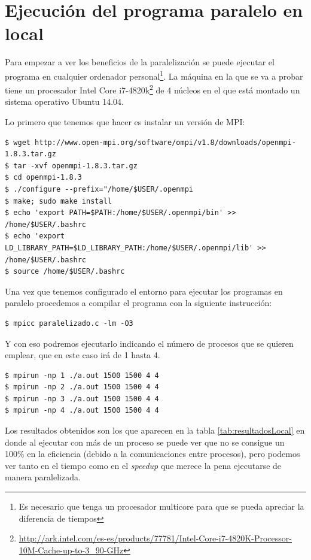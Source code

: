 \documentclass{article}
\begin{document}
\clearpage

\section{Ejecución del  programa paralelo en local}\label{sec:ejLocal}
	Para empezar a ver los beneficios de la paralelización se puede ejecutar el programa en cualquier ordenador personal\footnote{Es necesario que tenga un procesador multicore para que se pueda apreciar la diferencia de tiempos}. La máquina en la que se va a probar tiene un procesador Intel Core i7-4820k\footnote{\url{http://ark.intel.com/es-es/products/77781/Intel-Core-i7-4820K-Processor-10M-Cache-up-to-3_90-GHz}} de 4 núcleos en el que está montado un sistema operativo Ubuntu 14.04.
	
	Lo primero que tenemos que hacer es instalar un versión de MPI:
\begin{lstlisting}[style=minibash]
$ wget http://www.open-mpi.org/software/ompi/v1.8/downloads/openmpi-1.8.3.tar.gz
$ tar -xvf openmpi-1.8.3.tar.gz
$ cd openmpi-1.8.3
$ ./configure --prefix="/home/$USER/.openmpi
$ make; sudo make install
$ echo 'export PATH=$PATH:/home/$USER/.openmpi/bin' >> /home/$USER/.bashrc
$ echo 'export LD_LIBRARY_PATH=$LD_LIBRARY_PATH:/home/$USER/.openmpi/lib' >> /home/$USER/.bashrc
$ source /home/$USER/.bashrc
\end{lstlisting}

	Una vez que tenemos configurado el entorno para ejecutar los programas en paralelo procedemos a compilar el programa con la siguiente instrucción:
\begin{lstlisting}[style=minibash]
$ mpicc paralelizado.c -lm -O3
\end{lstlisting}
	Y con eso podremos ejecutarlo indicando el número de procesos que se quieren emplear, que en este caso irá de 1 hasta 4.
\begin{lstlisting}[style=minibash]
$ mpirun -np 1 ./a.out 1500 1500 4 4
$ mpirun -np 2 ./a.out 1500 1500 4 4
$ mpirun -np 3 ./a.out 1500 1500 4 4
$ mpirun -np 4 ./a.out 1500 1500 4 4
\end{lstlisting}

	Los resultados obtenidos son los que aparecen en la tabla \ref{tab:resultadosLocal} en donde al ejecutar con más de un proceso se puede ver que no se consigue un 100\% en la eficiencia (debido a la comunicaciones entre procesos), pero podemos ver tanto en el tiempo como en el \textit{speedup} que merece la pena ejecutarse de manera paralelizada.
	
\end{document}
